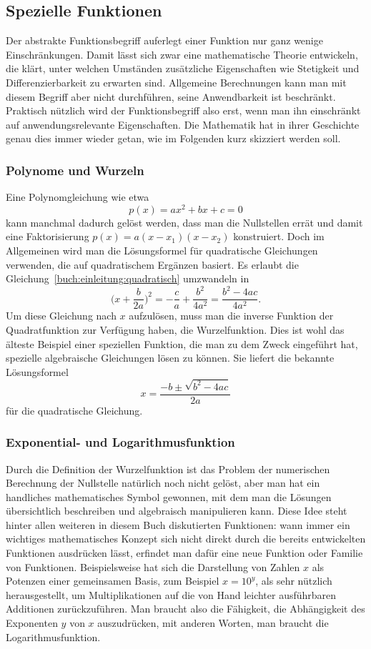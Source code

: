 %
%
\subsection*{Spezielle Funktionen}
Der abstrakte Funktionsbegriff auferlegt einer Funktion nur ganz wenige
Einschränkungen.
Damit lässt sich zwar eine mathematische Theorie entwickeln, die 
klärt, unter welchen Umständen zusätzliche Eigenschaften wie Stetigkeit
und Differenzierbarkeit zu erwarten sind.
Allgemeine Berechnungen kann man mit diesem Begriff aber nicht durchführen,
seine Anwendbarkeit ist beschränkt.
Praktisch nützlich wird der Funktionsbegriff also erst, wenn man ihn
einschränkt auf anwendungsrelevante Eigenschaften.
Die Mathematik hat in ihrer Geschichte genau dies immer wieder
getan, wie im Folgenden kurz skizziert werden soll.

%
%
\subsubsection{Polynome und Wurzeln}
Eine Polynomgleichung wie etwa
\begin{equation}
p(x) = ax^2+bx+c = 0
\label{buch:einleitung:quadratisch}
\end{equation}
kann manchmal dadurch gelöst werden, dass man die Nullstellen errät
und damit eine Faktorisierung $p(x)=a(x-x_1)(x-x_2)$ konstruiert.
Doch im Allgemeinen wird man die Lösungsformel für quadratische 
Gleichungen verwenden, die auf quadratischem Ergänzen basiert.
Es erlaubt die Gleichung~\eqref{buch:einleitung:quadratisch} umzwandeln in
\[
\biggl(x + \frac{b}{2a}\biggr)^2
=
-\frac{c}{a} + \frac{b^2}{4a^2}
=
\frac{b^2-4ac}{4a^2}.
\]
Um diese Gleichung nach $x$ aufzulösen, muss man die inverse Funktion
der Quadratfunktion zur Verfügung haben, die Wurzelfunktion.
Dies ist wohl das älteste Beispiel einer speziellen Funktion,
die man zu dem Zweck eingeführt hat, spezielle algebraische Gleichungen
lösen zu können.
Sie liefert die bekannte Lösungsformel
\[
x=\frac{-b\pm\sqrt{b^2-4ac}}{2a}
\]
für die quadratische Gleichung.

%
%
\subsubsection{Exponential- und Logarithmusfunktion}
Durch die Definition der Wurzelfunktion ist das Problem der numerischen
Berechnung der Nullstelle natürlich noch nicht gelöst, aber man hat
ein handliches mathematisches Symbol gewonnen, mit dem man die Lösungen
übersichtlich beschreiben und algebraisch manipulieren kann.
Diese Idee steht hinter allen weiteren in diesem Buch diskutierten
Funktionen: wann immer ein wichtiges mathematisches Konzept sich nicht
direkt durch die bereits entwickelten Funktionen ausdrücken lässt,
erfindet man dafür eine neue Funktion oder Familie von Funktionen.
Beispielsweise hat sich die Darstellung von Zahlen $x$ als Potenzen
einer gemeinsamen Basis, zum Beispiel $x=10^y$, als sehr nützlich
herausgestellt, um Multiplikationen auf die von Hand leichter
ausführbaren Additionen zurückzuführen.
Man braucht also die Fähigkeit, die Abhängigkeit des Exponenten $y$
von $x$ auszudrücken, mit anderen Worten, man braucht die
Logarithmusfunktion.

